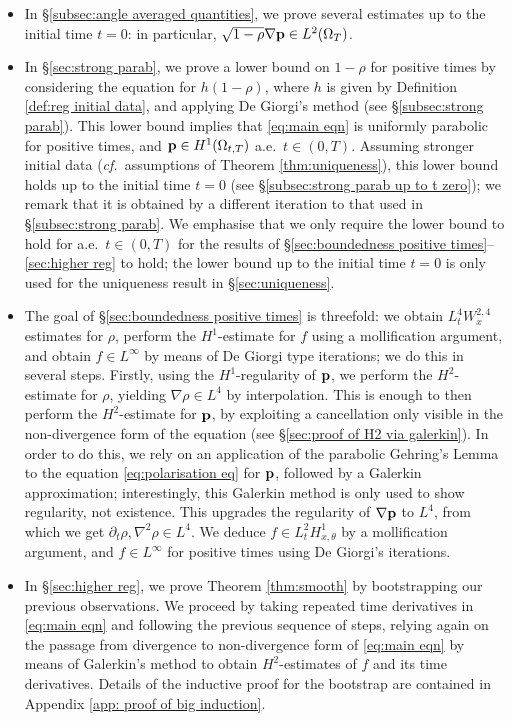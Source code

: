 \documentclass[11pt,a4paper,reqno]{amsart}
\theoremstyle{remark}
\theoremstyle{definition}
\numberwithin{equation}{section}
\newcommand{\p}{{\bf p}}
\begin{document}
\begin{itemize}
    \item[(i)] In \S \ref{subsec:angle averaged quantities}, we prove several estimates up to the initial time $t=0$: in particular,  $\sqrt{1-\rho}\nabla \p \in L^2(\Omega_T)$. 
    \item[(ii)] In \S \ref{sec:strong parab}, we prove a lower bound on $1\!-\!\rho$ for positive times by considering the equation for $h(1\!-\!\rho)$, where $h$ is given by Definition \ref{def:reg initial data}, and applying De Giorgi's method (see \S \ref{subsec:strong parab}). This lower bound implies that \eqref{eq:main eqn} is uniformly parabolic for positive times, and $\p \in H^1(\Omega_{t,T})$ a.e.~$t\in(0,T)$. Assuming stronger initial data (\textit{cf.}~assumptions of Theorem \ref{thm:uniqueness}), this lower bound holds up to the initial time $t=0$ (see \S \ref{subsec:strong parab up to t zero}); we remark that it is obtained by a different iteration to that used in \S \ref{subsec:strong parab}. We emphasise that we only require the lower bound to hold for a.e.~$t \in (0,T)$ for the results of \S \ref{sec:boundedness positive times}--\ref{sec:higher reg} to hold; the lower bound up to the initial time $t=0$ is only used for the uniqueness result in \S\ref{sec:uniqueness}.
    \item[(iii)] The goal of \S \ref{sec:boundedness positive times} is threefold: we obtain  $L^4_t W^{2,4}_x$ estimates for $\rho$, perform the $H^1$-estimate for $f$ using a mollification argument, and obtain $f \in L^\infty$ by means of De Giorgi type iterations; we do this in several steps. Firstly, using the $H^1$-regularity of $\p$, we perform the $H^2$-estimate for $\rho$, yielding  $\nabla \rho \in L^4$ by interpolation. This is enough to then perform the $H^2$-estimate for $\p$, by exploiting a cancellation only visible in the non-divergence form of the equation (see \S \ref{sec:proof of H2 via galerkin}). In order to do this, we rely on an application of the parabolic Gehring's Lemma to the equation \eqref{eq:polarisation eq} for $\p$, followed by a Galerkin approximation; interestingly, this Galerkin method is only used to show regularity, not existence. This upgrades the regularity of  $\nabla \p$ to $L^4$, from which we get   $\partial_t \rho, \nabla^2 \rho \in L^4$. We deduce $f \in L^2_t H^1_{x,\theta}$ by a mollification argument, and $f \in L^\infty$ for positive times using De Giorgi's iterations. 
    \item[(iv)] In \S \ref{sec:higher reg}, we prove Theorem \ref{thm:smooth} by bootstrapping our previous observations. We proceed by taking repeated time derivatives in \eqref{eq:main eqn} and following the previous sequence of steps, relying again on the passage from divergence to non-divergence form of \eqref{eq:main eqn} by means of Galerkin's method to obtain $H^2$-estimates of $f$ and its time derivatives. Details of the inductive proof for the bootstrap are contained in Appendix \ref{app: proof of big induction}. 

\end{itemize}
\end{document}
